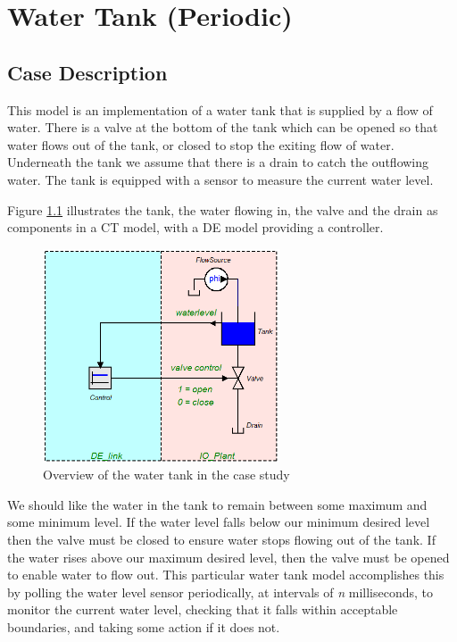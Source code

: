 \chapter{Water Tank (Periodic)} \label{chap:watertankperiodic}
\section{Case Description}
This model is an implementation of a water tank that is supplied by a
flow of water.  There is a valve at the bottom of the tank which can
be opened so that water flows out of the tank, or closed to stop the
exiting flow of water.  Underneath the tank we assume that there is a
drain to catch the outflowing water.  The tank is equipped with a
sensor to measure the current water level.

Figure \ref{fig:waterTank} illustrates the tank, the water flowing in,
the valve and the drain as components in a CT model, with a DE model
providing a controller.

\begin{figure}[!ht]
\centering
\includegraphics[width=7cm]{waterTankPeriodic/WaterTank.png}
\caption{Overview of the water tank in the case
  study \label{fig:waterTank}}
\end{figure}

We should like the water in the tank to remain between some maximum
and some minimum level.  If the water level falls below our minimum
desired level then the valve must be closed to ensure water stops
flowing out of the tank.  If the water rises above our maximum desired
level, then the valve must be opened to enable water to flow out.
This particular water tank model accomplishes this by polling the
water level sensor periodically, at intervals of \emph{n}
milliseconds, to monitor the current water level, checking that it
falls within acceptable boundaries, and taking some action if it does
not.

